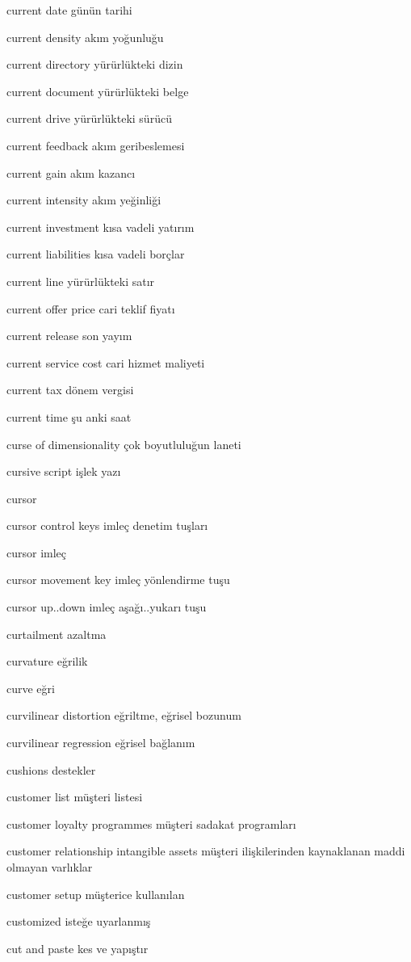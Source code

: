 \documentclass[12pt,fleqn]{article}\usepackage{../../common}
\begin{document}
current date günün tarihi

current density akım yoğunluğu

current directory yürürlükteki dizin

current document yürürlükteki belge

current drive yürürlükteki sürücü

current feedback akım geribeslemesi

current gain akım kazancı

current intensity akım yeğinliği

current investment kısa vadeli yatırım

current liabilities kısa vadeli borçlar

current line yürürlükteki satır

current offer price cari teklif fiyatı

current release son yayım

current service cost cari hizmet maliyeti

current tax dönem vergisi

current time şu anki saat

curse of dimensionality çok boyutluluğun laneti

cursive script işlek yazı

cursor

cursor control keys imleç denetim tuşları

cursor imleç

cursor movement key imleç yönlendirme tuşu

cursor up..down imleç aşağı..yukarı tuşu

curtailment azaltma

curvature eğrilik

curve eğri

curvilinear distortion eğriltme, eğrisel bozunum

curvilinear regression eğrisel bağlanım

cushions destekler

customer list müşteri listesi

customer loyalty programmes müşteri sadakat programları

customer relationship intangible assets müşteri ilişkilerinden kaynaklanan maddi olmayan varlıklar

customer setup müşterice kullanılan

customized isteğe uyarlanmış

cut and paste kes ve yapıştır
\end{document}
